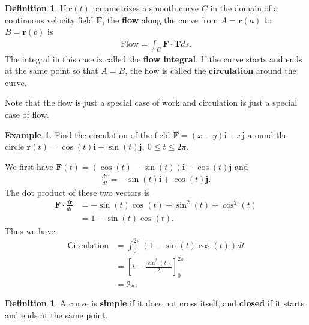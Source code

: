 \documentclass[12pt, letter]{article}
\theoremstyle{plain}
\numberwithin{theorem}{section}
\theoremstyle{definition}
\newtheorem{definition}[theorem]{Definition}
\newtheorem{example}[theorem]{Example}
\begin{document}
\bigskip

\hrulefill

\bigskip

\begin{definition}
If $\bm{r}(t)$ parametrizes a smooth curve $C$ in the domain of a continuous velocity field $\bm{F}$, the \textbf{flow} along the curve from $A=\bm{r}(a)$ to $B=\bm{r}(b)$ is
\begin{align*}
\text{Flow} = \int_C \bm{F}\cdot \bm{T} ds.
\end{align*}
The integral in this case is called the \textbf{flow integral}. If the curve starts and ends at the same point so that $A=B$, the flow is called the \textbf{circulation} around the curve.
\end{definition}

\bigskip

Note that the flow is just a special case of work and circulation is just a special case of flow.

\bigskip

\hrulefill

\bigskip

\begin{example}
Find the circulation of the field $\bm{F}=(x-y)\bm{i}+x\bm{j}$ around the circle $\bm{r}(t) = \cos(t)\bm{i}+\sin(t)\bm{j}, \ 0\leq t \leq 2\pi$.

\bigskip

We first have $\bm{F}(t) = (\cos(t)-\sin(t))\bm{i}+\cos(t)\bm{j}$ and 
\begin{align*}
\frac{d\bm{r}}{dt} = -\sin(t)\bm{i}+\cos(t)\bm{j}.
\end{align*}
The dot product of these two vectors is
\begin{align*}
\bm{F} \cdot \frac{d\bm{r}}{dt} &= -\sin(t)\cos(t)+\sin^2(t)+\cos^2(t)\\
&= 1-\sin(t)\cos(t).
\end{align*}
Thus we have
\begin{align*}
\text{Circulation} &= \int_0^{2\pi} (1-\sin(t)\cos(t))dt\\
&= \left[ t- \frac{\sin^2(t)}{2}\right]_0^{2\pi}\\
&=2\pi.
\end{align*}
\end{example}

\bigskip

\hrulefill

\bigskip

\begin{definition}
A curve is \textbf{simple} if it does not cross itself, and \textbf{closed} if it starts and ends at the same point.
\end{definition}
\end{document}
